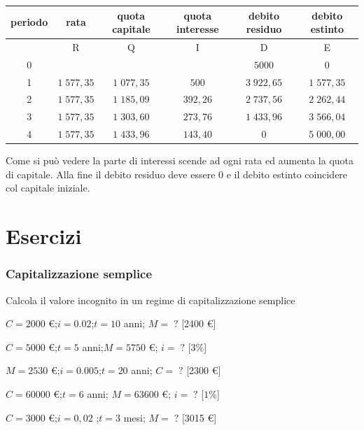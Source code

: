 \begin{exrig}
\begin{esempio}
\begin{tabular}{c|c|c|c|c|c}
\hline
    periodo & rata & quota capitale & quota interesse & debito residuo & 
debito estinto\\ \hline
	 & R & Q & I & D & E\\ \hline
	0 &  &  &  & \(5000\) & \(0\)\\
	1 & \(1\;577,35\) & \(1\;077,35\) & \(500\) & \(3\;922,65\) 
	  & \(1\;577,35\)\\
	2 & \(1\;577,35\) & \(1\;185,09\)& \(392,26\) & \(2\;737,56\) 
	  & \(2\;262,44\)\\
	3 & \(1\;577,35\) & \(1\;303,60\) & \(273,76\) & \(1\;433,96\) 
	  & \(3\;566,04\)\\
	4 & \(1\;577,35\) & \(1\;433,96\) & \(143,40\) & \(0\) 
	  & \(5\;000,00\)\\
	\hline
\end{tabular}
Come si può vedere la parte di interessi scende ad ogni rata ed aumenta la 
quota di capitale. Alla fine il debito residuo deve essere 0 e il debito 
estinto coincidere col capitale iniziale. 
\end{esempio}
\end{exrig}

\section{Esercizi}

\subsubsection{Capitalizzazione semplice}

\begin{esercizio}
Calcola il valore incognito in un regime di capitalizzazione semplice
 \begin{enumeratea}
 \item \(C = 2000\) \euro ;\quad \(i = 0.02\);\quad \(t = 10\) anni;
         \quad \(M=\;?\) \hfill [2400 \euro]
 \item \(C = 5000\) \euro ;\quad \(t = 5\) anni;\quad \(M = 5750\) \euro;
         \quad \(i=\;?\) \hfill [\(3 \%\)]
 \item \(M = 2530\) \euro ;\quad \(i = 0.005\);\quad \(t = 20\) anni;
         \quad \(C=\;?\) \hfill [2300 \euro]
 \item \(C = 60000\) \euro ;\quad \(t = 6\) anni;
         \quad \(M = 63600\) \euro;\quad 
\(i=\;?\) \hfill [\(1 \%\)]
 \item \(C = 3000\) \euro ;\quad \(i = 0,02\) ;\quad \(t = 3\) mesi;
         \quad \(M=\;?\) \hfill [3015 \euro]
 \end{enumeratea}
\end{esercizio}


